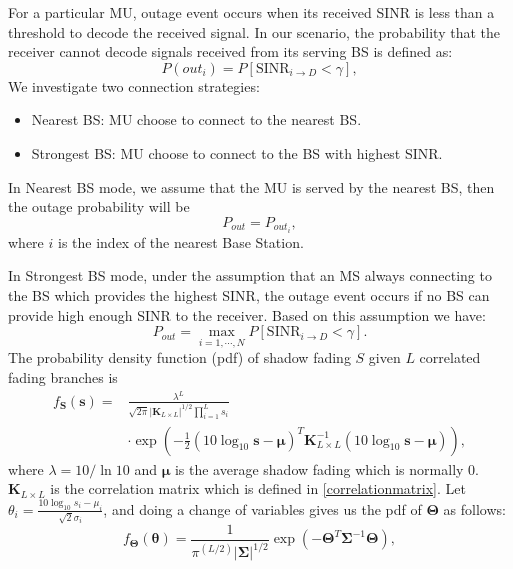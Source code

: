  \par For a particular MU, outage event occurs when its received SINR is less than a threshold to decode the received signal. In our scenario, the probability that the receiver cannot decode signals received from its serving BS is defined as:
 \begin{equation}
 P(out_{i}) = P[\text{SINR}_{i\to D} < \gamma],
 \end{equation}
 We investigate two connection strategies: 
 \begin{itemize}
 \item Nearest BS: MU choose to connect to the nearest BS.
 \item Strongest BS: MU choose to connect to the BS with highest SINR.
 \end{itemize}
 \par In Nearest BS mode, we assume that the MU is served by the nearest BS, then the outage probability will be 
 \begin{equation}
 P_{out} = P_{out_{i}},
 \end{equation} 
 where $i$ is the index of the nearest Base Station. 
 \par In Strongest BS mode, under the assumption that an MS always connecting to the BS which provides the highest SINR, the outage event occurs if no BS can provide high enough SINR to the receiver. Based on this assumption we have:
 \begin{equation}
 P_{out} = \max_{i = 1,\cdots,N} P[\text{SINR}_{i\to D}<\gamma].
 \end{equation}
 The probability density function (pdf) of shadow fading $S$ given $L$ correlated fading branches is
 \begin{equation}
 \begin{split}
 f_{\mathbf{S}}(\mathbf{s}) = &\frac{\lambda^{L}}{\sqrt{2\pi}|\mathbf{K}_{L\times L}|^{1/2}\prod_{i=1}^{L}s_{i}}\\
 &\cdot\exp(-\frac{1}{2}(10\log_{10}\mathbf{s}-\boldsymbol{\mu})^{T}\mathbf{K}_{L\times L}^{-1}(10\log_{10}\mathbf{s}-\boldsymbol{\mu})),
 \end{split}
 \end{equation}
 where $\lambda = 10/\ln10$ and $\boldsymbol{\mu}$ is the average shadow fading which is normally $0$. $\mathbf{K}_{L\times L}$ is the correlation matrix which is defined in \eqref{correlationmatrix}. Let $\theta_{i} = \frac{10\log_{10}s_{i}-\mu_{i}}{\sqrt{2}\sigma_{i}}$, and doing a change of variables gives us the pdf of $\mathbf{\Theta}$ as follows:
 \begin{equation}
 f_{\mathbf{\Theta}}(\boldsymbol{\theta}) = \frac{1}{\pi^(L/2)|\mathbf{\Sigma}|^{1/2}}\exp(-\mathbf{\Theta}^{T}\mathbf{\Sigma}^{-1}\mathbf{\Theta}),
 \end{equation}
